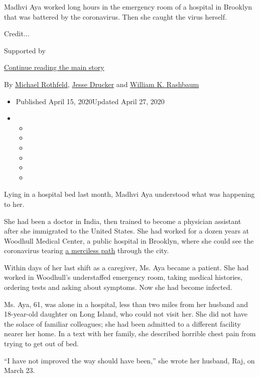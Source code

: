 Madhvi Aya worked long hours in the emergency room of a hospital in
Brooklyn that was battered by the coronavirus. Then she caught the virus
herself.

Credit...

Supported by

\protect\hyperlink{after-sponsor}{Continue reading the main story}

By \href{https://www.nytimes.com/by/michael-rothfeld}{Michael Rothfeld},
\href{https://www.nytimes.com/by/jesse-drucker}{Jesse Drucker} and
\href{https://www.nytimes.com/by/william-k-rashbaum}{William K.
Rashbaum}

\begin{itemize}
\item
  Published April 15, 2020Updated April 27, 2020
\item
  \begin{itemize}
  \item
  \item
  \item
  \item
  \item
  \item
  \end{itemize}
\end{itemize}

Lying in a hospital bed last month, Madhvi Aya understood what was
happening to her.

She had been a doctor in India, then trained to become a physician
assistant after she immigrated to the United States. She had worked for
a dozen years at Woodhull Medical Center, a public hospital in Brooklyn,
where she could see the coronavirus tearing
\href{https://www.nytimes.com/2020/04/09/nyregion/coronavirus-queens-corona-jackson-heights-elmhurst.html}{a
merciless path} through the city.

Within days of her last shift as a caregiver, Ms. Aya became a patient.
She had worked in Woodhull's understaffed emergency room, taking medical
histories, ordering tests and asking about symptoms. Now she had become
infected.

Ms. Aya, 61, was alone in a hospital, less than two miles from her
husband and 18-year-old daughter on Long Island, who could not visit
her. She did not have the solace of familiar colleagues; she had been
admitted to a different facility nearer her home. In a text with her
family, she described horrible chest pain from trying to get out of bed.

``I have not improved the way should have been,'' she wrote her husband,
Raj, on March 23.

